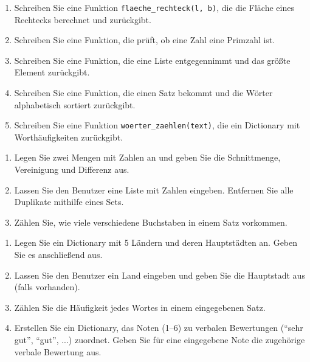 \documentclass[11pt, a4paper, oneside]{article}
\begin{document}
	\begin{enumerate}[label=\alph*)]
		\item Schreiben Sie eine Funktion \texttt{flaeche\_rechteck(l, b)}, die die Fläche eines Rechtecks berechnet und zurückgibt.
		\item Schreiben Sie eine Funktion, die prüft, ob eine Zahl eine Primzahl ist.
		\item Schreiben Sie eine Funktion, die eine Liste entgegennimmt und das größte Element zurückgibt.
		\item Schreiben Sie eine Funktion, die einen Satz bekommt und die Wörter alphabetisch sortiert zurückgibt.
		\item Schreiben Sie eine Funktion \texttt{woerter\_zaehlen(text)}, die ein Dictionary mit Worthäufigkeiten zurückgibt.
	\end{enumerate}
	
	
	\begin{enumerate}[label=\alph*)]
		\item Legen Sie zwei Mengen mit Zahlen an und geben Sie die Schnittmenge, Vereinigung und Differenz aus.
		\item Lassen Sie den Benutzer eine Liste mit Zahlen eingeben. Entfernen Sie alle Duplikate mithilfe eines Sets.
		\item Zählen Sie, wie viele verschiedene Buchstaben in einem Satz vorkommen.
	\end{enumerate}
	
	
	\begin{enumerate}[label=\alph*)]
		\item Legen Sie ein Dictionary mit 5 Ländern und deren Hauptstädten an. Geben Sie es anschließend aus.
		\item Lassen Sie den Benutzer ein Land eingeben und geben Sie die Hauptstadt aus (falls vorhanden).
		\item Zählen Sie die Häufigkeit jedes Wortes in einem eingegebenen Satz.
		\item Erstellen Sie ein Dictionary, das Noten (1--6) zu verbalen Bewertungen (``sehr gut'', ``gut'', ...) zuordnet.
		Geben Sie für eine eingegebene Note die zugehörige verbale Bewertung aus.
	\end{enumerate}
	
	
\end{document}
